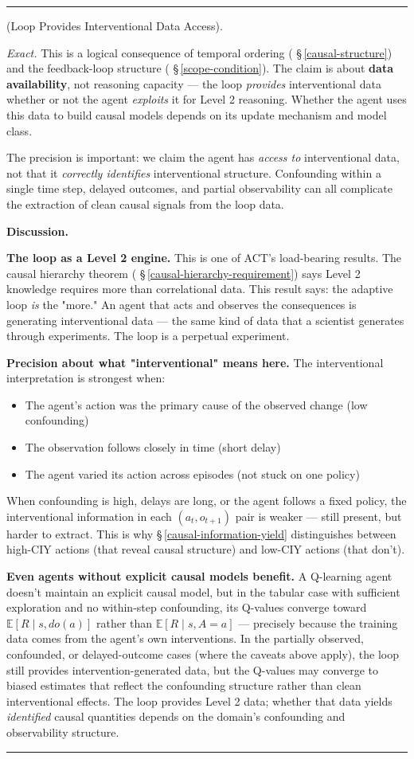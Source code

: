 \documentclass[11pt,oneside]{article}
\newcounter{claim}[section]
\renewcommand{\theclaim}{\thesection.\arabic{claim}}
\newenvironment{segment}[2]{%
  \refstepcounter{claim}%
  \bigskip\noindent\hrule\smallskip
  \noindent{\bfseries #1~\theclaim}\enskip(#2).\par\smallskip
  \noindent\ignorespaces
}{%
  \par\smallskip\noindent\hrule\bigskip
}
\newenvironment{proposition}[1][]{\begin{segment}{Proposition}{#1}}{\end{segment}}
\begin{document}
\begin{proposition}[Loop Provides Interventional Data Access]
\textit{Exact.} This is a logical consequence of temporal ordering ( \S\,\ref{causal-structure}) and the feedback-loop structure ( \S\,\ref{scope-condition}). The claim is about \textbf{data availability}, not reasoning capacity — the loop \textit{provides} interventional data whether or not the agent \textit{exploits} it for Level 2 reasoning. Whether the agent uses this data to build causal models depends on its update mechanism and model class.

The precision is important: we claim the agent has \textit{access to} interventional data, not that it \textit{correctly identifies} interventional structure. Confounding within a single time step, delayed outcomes, and partial observability can all complicate the extraction of clean causal signals from the loop data.


\medskip\noindent\textbf{Discussion.}


\textbf{The loop as a Level 2 engine.} This is one of ACT's load-bearing results. The causal hierarchy theorem ( \S\,\ref{causal-hierarchy-requirement}) says Level 2 knowledge requires more than correlational data. This result says: the adaptive loop \textit{is} the "more." An agent that acts and observes the consequences is generating interventional data — the same kind of data that a scientist generates through experiments. The loop is a perpetual experiment.

\textbf{Precision about what "interventional" means here.} The interventional interpretation is strongest when:
\begin{itemize}
  \item The agent's action was the primary cause of the observed change (low confounding)
  \item The observation follows closely in time (short delay)
  \item The agent varied its action across episodes (not stuck on one policy)
\end{itemize}


When confounding is high, delays are long, or the agent follows a fixed policy, the interventional information in each $(a_t, o_{t+1})$ pair is weaker — still present, but harder to extract. This is why \S\,\ref{causal-information-yield} distinguishes between high-CIY actions (that reveal causal structure) and low-CIY actions (that don't).

\textbf{Even agents without explicit causal models benefit.} A Q-learning agent doesn't maintain an explicit causal model, but in the tabular case with sufficient exploration and no within-step confounding, its Q-values converge toward $\mathbb{E}[R \mid s, do(a)]$ rather than $\mathbb{E}[R \mid s, A=a]$ — precisely because the training data comes from the agent's own interventions. In the partially observed, confounded, or delayed-outcome cases (where the caveats above apply), the loop still provides intervention-generated data, but the Q-values may converge to biased estimates that reflect the confounding structure rather than clean interventional effects. The loop provides Level 2 data; whether that data yields \textit{identified} causal quantities depends on the domain's confounding and observability structure.


\end{proposition}
\end{document}
